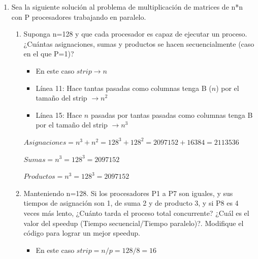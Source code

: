\documentclass[a4paper, 10pt]{article}
\newenvironment{QandA}{
    \begin{enumerate}\bfseries}
    {\end{enumerate}
}
\newenvironment{answered}{\par\normalfont}{}
\begin{document}
\begin{QandA}
\begin{enumerate}
\begin{answered}
\begin{itemize}
\\
\begin{center}
    unidades de tiempo $\rightarrow 2 * \sum_{i=1}^n n-i $
\end{center}
\item Sort Merged Network $\rightarrow$ La lógica en este algoritmo, es similiar al pipeline (comparar, asignar y enviar). Por tal motivo, cada proceso hara tantas comparaciones como envío de mensajes:
\\
\begin{center}
    unidades de tiempo $\rightarrow 2 * (n * log_2 n)$
\end{center}
\end{itemize}  
\end{answered}
\end{enumerate}

\item Sea la siguiente solución al problema de multiplicación de matrices de n*n con P procesadores trabajando en paralelo.

\begin{enumerate}
\item Suponga n=128 y que cada procesador es capaz de ejecutar un proceso. ¿Cuántas asignaciones, sumas y productos se hacen secuencialmente (caso en el que P=1)?
\begin{answered}
\begin{itemize}
    \item En este caso $strip \rightarrow n$
    \item Línea 11: Hace tantas pasadas como columnas tenga B ($n$) por el tamaño del strip $\rightarrow n^2$
    \item Línea 15: Hace $n$ pasadas por tantas pasadas como columnas tenga B por el tamaño del strip $\rightarrow n^3$
\end{itemize}

$Asignaciones = n^3 + n^2 = 128^3 + 128^2 = 2097152 + 16384 = 2113536$

$Sumas = n^3 = 128^3 = 2097152$

$Productos = n^3 = 128^3 = 2097152$ 
\end{answered}
\item Manteniendo n=128. Si los procesadores P1 a P7 son iguales, y sus tiempos de asignación son 1, de suma 2 y de producto 3, y si
P8 es 4 veces más lento, ¿Cuánto tarda el proceso total concurrente? ¿Cuál es el valor del speedup (Tiempo
secuencial/Tiempo paralelo)?. Modifique el código para lograr un mejor speedup.
\begin{answered}
\begin{itemize}
    \item En este caso $strip = n/p = 128/8 = 16$
\end{itemize}


\end{answered}
\end{enumerate}
\end{QandA}
\end{document}

